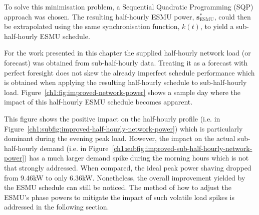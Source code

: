 To solve this minimisation problem, a Sequential Quadratic Programming (SQP) approach was chosen.
The resulting half-hourly ESMU power, $\textbf{s}^*_\text{ESMU}$, could then be extrapolated using the same synchronisation function, $k(t)$, to yield a sub-half-hourly ESMU schedule.

For the work presented in this chapter the supplied half-hourly network load (or forecast) was obtained from sub-half-hourly data.
Treating it as a forecast with perfect foresight does not skew the already imperfect schedule performance which is obtained when applying the resulting half-hourly schedule to sub-half-hourly load.
Figure~\ref{ch1:fig:improved-network-power} shows a sample day where the impact of this half-hourly ESMU schedule becomes apparent.



This figure shows the positive impact on the half-hourly profile (i.e. in Figure~\ref{ch1:subfig:improved-half-hourly-network-power}) which is particularly dominant during the evening peak load.
However, the impact on the actual sub-half-hourly demand (i.e. in Figure~\ref{ch1:subfig:improved-sub-half-hourly-network-power}) has a much larger demand spike during the morning hours which is not that strongly addressed.
When compared, the ideal peak power shaving dropped from 9.46kW to only 6.36kW.
Nonetheless, the overall improvement yielded by the ESMU schedule can still be noticed. 
The method of how to adjust the ESMU's phase powers to mitigate the impact of such volatile load spikes is addressed in the following section.

